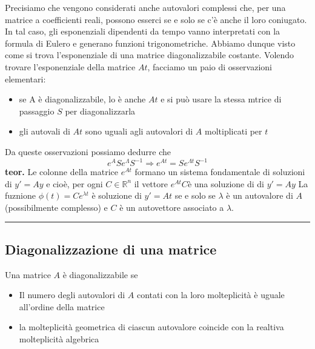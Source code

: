 \newline
Precisiamo che vengono considerati anche autovalori complessi che, per una matrice a coefficienti reali, possono esserci se e solo se c'è anche il loro coniugato. In tal caso, gli esponenziali dipendenti da tempo vanno interpretati con la formula di Eulero e generano funzioni trigonometriche.\newline
\newline
Abbiamo dunque visto come si trova l'esponenziale di una matrice diagonalizzabile costante. Volendo trovare l'esponenziale della matrice $At$, facciamo un paio di osservazioni elementari:
\begin{itemize}
    \item se A è diagonalizzabile, lo è anche $At$ e si può usare la stessa mtrice di passaggio $S$ per diagonalizzarla
    \item gli autovali di $At$ sono uguali agli autovalori di $A$ moltiplicati per $t$
\end{itemize}
Da queste osservazioni possiamo dedurre che
\[
    e^A  S e^{\Lambda}S^{-1} \Rightarrow  e^{At} = S e^{\Lambda t} S^{-1}
\]
\textbf{teor.} Le colonne della matrice $e^{At}$ formano un sistema fondamentale di soluzioni di $y' = Ay$ e cioè, per ogni $C \in \mathbb{R}^n$ il vettore $e^{At} C$è una soluzione di di $y'=Ay$\newline
\newline
La fuznione $\phi(t) = C e^{\lambda t} $ è soluzione di $y'=At$ se e solo se $\lambda$ è un autovalore di $A$ (possibilmente complesso) e $C$ è un autovettore associato a $\lambda$.\newline
\rule{\textwidth}{0,4pt}
\subsection{Diagonalizzazione di una matrice}
Una matrice $A$ è diagonalizzabile se
\begin{itemize}
    \item Il numero degli autovalori di $A$ contati con la loro molteplicità è uguale all'ordine della matrice
    \item la molteplicità geometrica di ciascun autovalore coincide  con la realtiva molteplicità algebrica
\end{itemize}

